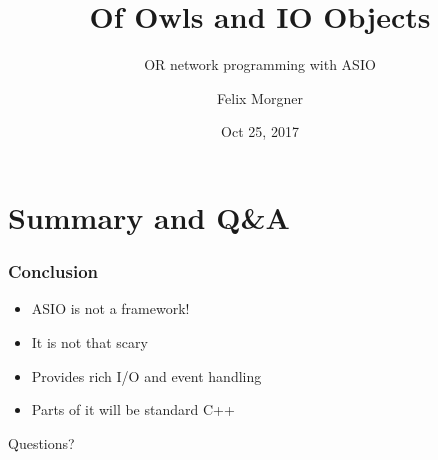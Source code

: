 \documentclass{beamer}
\title{Of Owls and IO Objects}
\author{Felix Morgner}
\subtitle{OR network programming with ASIO}
\date{Oct 25, 2017}
\institute[%
  University of Applied Sciences Rapperswil%
]{Institute for Software\\University of Applied Sciences Rapperswil}
\begin{document}
\maketitle







\section{Summary and Q\&A}
\begin{frame}
  \frametitle{Conclusion}
  \begin{itemize}
    \item{ASIO is not a framework!}\pause{}
    \item{It is not that scary}\pause{}
    \item{Provides rich I/O and event handling}\pause{}
    \item{Parts of it will be standard C++}
  \end{itemize}
\end{frame}
\begin{frame}
  \begin{center}
    \Huge{Questions?}
  \end{center}
\end{frame}
\end{document}
